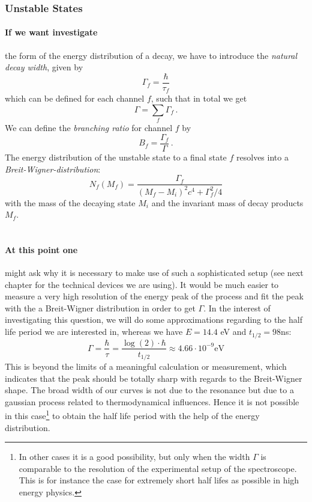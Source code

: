 \subsubsection{Unstable States}
\label{ssub:Unstable States}
\paragraph{If we want investigate}
the form of the energy distribution of a decay, we have to 
introduce the \emph{natural decay width}, given by
\begin{equation}
    \Gamma_f = \frac{\hbar}{\tau_f} 
\end{equation}
which can be defined for each channel $f$, such that in total we get
\begin{equation}
    \Gamma = \sum_{f} \Gamma_f \, .
\end{equation}
We can define the \emph{branching ratio} for channel $f$ by
\begin{equation}
    B_f = \frac{\Gamma_f}{\Gamma} \, .
\end{equation}
The energy distribution of the unstable state to a final state $f$ resolves into a 
\emph{Breit-Wigner-distribution}: 
\begin{equation}
    N_f(M_f) = \frac{\Gamma_f}{(M_f-M_i)^2 c^4 + \Gamma_f^2/4}
\end{equation}
with the mass of the decaying state $M_i$ and the invariant mass of decay products $M_f$. \\\\
\paragraph{At this point one}
might ask why it is necessary to make use of such a sophisticated setup (see next chapter
for the technical devices we are using). It would be much easier to measure a very high resolution of the
energy peak of the process and fit the peak with the a Breit-Wigner distribution in order to get $\Gamma$. 
In the interest of investigating this question, we will do some approximations regarding to the
half life period we are interested in, whereas we have $E = 14.4$ eV and $t_{1/2} = 98$ns:
\begin{equation}
    \Gamma = \frac{\hbar}{\tau} = \frac{\log(2)\cdot \hbar}{t_{1/2}} \approx 4.66 \cdot 10^{-9} \mathrm{eV} 
\end{equation}
This is beyond the limits of a meaningful calculation or measurement, which indicates that the peak should
be totally sharp with regards to the Breit-Wigner shape. The broad width of our curves is not due to the
resonance but due to a gaussian process related to thermodynamical influences. Hence it is not possible
in this case\footnote{In other cases it is a good possibility, but only when the width $\Gamma$ is comparable
to the resolution of the experimental setup of the spectroscope. This is for instance the case for extremely
short half lifes as possible in high energy physics.}
to obtain the half life period with the help of the energy distribution.
\clearpage

